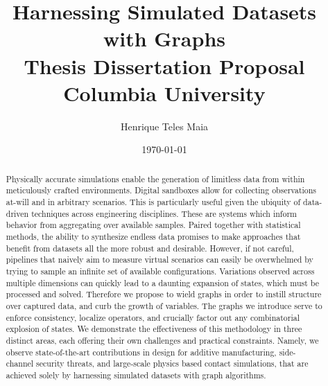 \documentclass[12pt]{report}
\title{
    {Harnessing Simulated Datasets with Graphs}\\
    {\large Thesis Dissertation Proposal}\\
    {\large Columbia University}\\
}
\author{Henrique Teles Maia}
\date{\today}
\begin{document}
\maketitle

\begin{abstract}
Physically accurate simulations enable the generation of 
limitless data from within meticulously crafted environments. 
Digital sandboxes allow for collecting observations at-will and in arbitrary scenarios.
This is particularly useful given the ubiquity of data-driven techniques across engineering disciplines.
These are systems which inform behavior from aggregating over available samples.
Paired together with statistical methods, the ability to synthesize endless data
promises to make approaches that benefit from datasets all the more robust and desirable. 
However, if not careful, pipelines that naively aim to measure virtual scenarios
can easily be overwhelmed by trying to sample an infinite set of available configurations.
Variations observed across multiple dimensions can quickly lead to a daunting expansion of states,
which must be processed and solved.
Therefore we propose to wield graphs in order to instill structure over captured data,
and curb the growth of variables.
The graphs we introduce serve to enforce consistency, localize operators, 
and crucially factor out any combinatorial explosion of states. 
We demonstrate the effectiveness of this methodology in three distinct areas, 
each offering their own challenges and practical constraints. 
Namely, we observe state-of-the-art contributions in design for additive manufacturing, 
side-channel security threats, and large-scale physics based contact simulations, 
that are achieved solely by harnessing simulated datasets with graph algorithms.
\end{abstract}

\setcounter{secnumdepth}{1}
\setcounter{tocdepth}{1}
\tableofcontents
\end{document}
